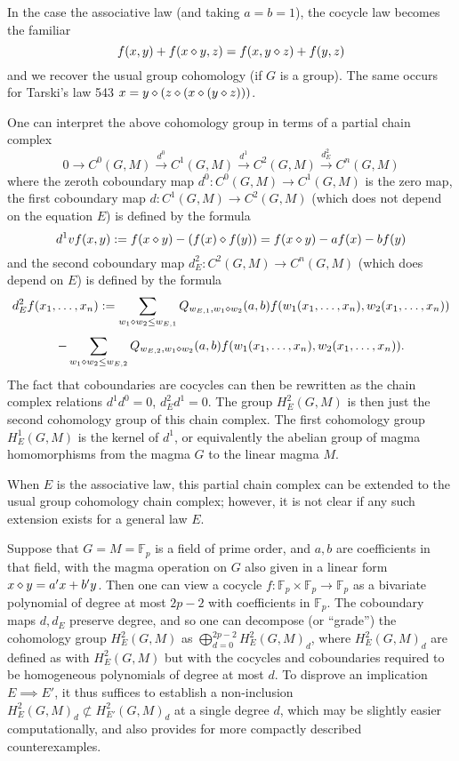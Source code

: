 \begin{remark} In the case the associative law (and taking $a=b=1$), the cocycle law becomes the familiar
  $$ f(x,y) + f(x \diamond y, z) = f(x, y \diamond z) + f(y,z)$$
and we recover the usual group cohomology (if $G$ is a group).  The same occurs for Tarski's law 543
$x = y \diamond (z \diamond (x \diamond (y \diamond z)))$.
\end{remark}

\begin{remark}  One can interpret the above cohomology group in terms of a partial chain complex
$$ 0 \to C^0(G,M) \stackrel{d^0}{\to} C^1(G,M) \stackrel{d^1}{\to} C^2(G,M) \stackrel{d^2_E}{\to} C^n(G,M)$$
where the zeroth coboundary map $d^0: C^0(G,M) \to C^1(G,M)$ is the zero map, the first coboundary map $d: C^1(G,M) \to C^2(G,M)$ (which does not depend on the equation $E$) is defined by the formula
$$ d^1 vf(x,y) := f(x \diamond y) - (f(x) \diamond f(y)) = f(x \diamond y) - af(x) - bf(y)$$
and the second coboundary map $d^2_E: C^2(G,M) \to C^n(G,M)$ (which does depend on $E$) is defined by the formula
$$ d^2_E f(x_1,\dots,x_n) := \sum_{w_1 \diamond w_2 \leq w_{E,1}} Q_{w_{E,1},w_1 \diamond w_2}(a,b) f(w_1(x_1,\dots,x_n), w_2(x_1,\dots,x_n))$$
$$ - \sum_{w_1 \diamond w_2 \leq w_{E,2}} Q_{w_{E,2},w_1 \diamond w_2}(a,b) f(w_1(x_1,\dots,x_n), w_2(x_1,\dots,x_n)).$$
The fact that coboundaries are cocycles can then be rewritten as the chain complex relations $d^1 d^0=0$, $d^2_E d^1 = 0$.  The group $H^2_E(G,M)$ is then just the second cohomology group of this chain complex.  The first cohomology group $H^1_E(G,M)$ is the kernel of $d^1$, or equivalently the abelian group of magma homomorphisms from the magma $G$ to the linear magma $M$.

When $E$ is the associative law, this partial chain complex can be extended to the usual group cohomology chain complex; however, it is not clear if any such extension exists for a general law $E$.
\end{remark}

\begin{remark}  Suppose that $G = M = \mathbb{F}_p$ is a field of prime order, and $a,b$ are coefficients in that field, with the magma operation on $G$ also given in a linear form $x \diamond y = a'x  + b' y$.  Then one can view a cocycle $f: \mathbb{F}_p \times \mathbb{F}_p \to \mathbb{F}_p$ as a bivariate polynomial of degree at most $2p-2$ with coefficients in $ \mathbb{F}_p$.  The coboundary maps $d, d_E$ preserve degree, and so one can decompose (or ``grade'') the cohomology group $H^2_E(G,M)$ as $\bigoplus_{d=0}^{2p-2} H^2_E(G,M)_d$, where $H^2_E(G,M)_d$ are defined as with $H^2_E(G,M)$ but with the cocycles and coboundaries required to be homogeneous polynomials of degree at most $d$.  To disprove an implication $E \implies E'$, it thus suffices to establish a non-inclusion $H^2_E(G,M)_d \not\subset H^2_{E'}(G,M)_d$ at a single degree $d$, which may be slightly easier computationally, and also provides for more compactly described counterexamples.
\end{remark}
